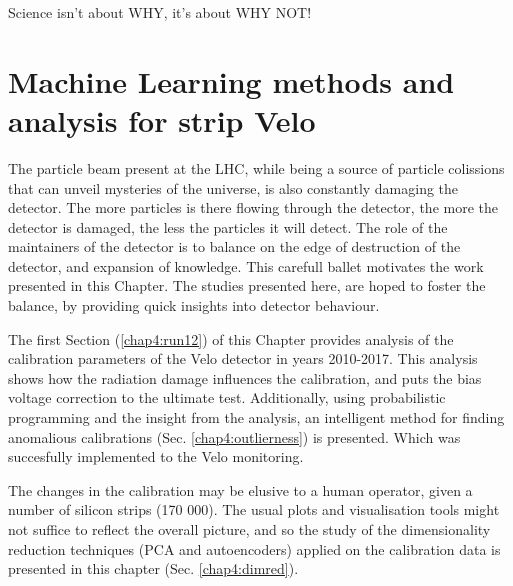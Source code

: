 \begin{savequote}[75mm]
Science isn't about WHY, it's about WHY NOT!
\end{savequote}
\chapter{Machine Learning methods and analysis for strip Velo}
\label{chap:ml-velo}


The particle beam present at the LHC, while being a source of particle colissions that can unveil mysteries of the universe, is also constantly damaging the detector.
The more particles is there flowing through the detector, the more the detector is damaged, the less the particles it will detect.
The role of the maintainers of the detector is to balance on the edge of destruction of the detector, and expansion of knowledge.
This carefull ballet motivates the work presented in this Chapter.
The studies presented here, are hoped to foster the balance, by providing quick insights into detector behaviour.

The first Section (\ref{chap4:run12}) of this Chapter provides analysis of the calibration parameters of the Velo detector in years 2010-2017. This analysis shows how the radiation damage influences the calibration, and puts the bias voltage correction to the ultimate test. 
Additionally, using probabilistic programming and the insight from the analysis, an intelligent method for finding anomalious calibrations (Sec. \ref{chap4:outlierness}) is presented. Which was succesfully implemented to the Velo monitoring.

The changes in the calibration may be elusive to a human operator, given a number of silicon strips (170 000).
The usual plots and visualisation tools might not suffice to reflect the overall picture, and so the study of the dimensionality reduction techniques (PCA and autoencoders) applied on the calibration data is presented in this chapter (Sec. \ref{chap4:dimred}). 

